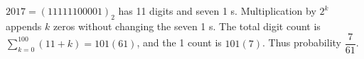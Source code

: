 $2017=(11111100001)_2$ has 11 digits and seven 1 s. Multiplication by $2^k$ appends $k$ zeros without changing the seven 1 s. The total digit count is $\sum_{k=0}^{100}(11+k)=101(61)$, and the 1 count is $101(7)$. Thus probability $\boxed{\dfrac{7}{61}}$.
